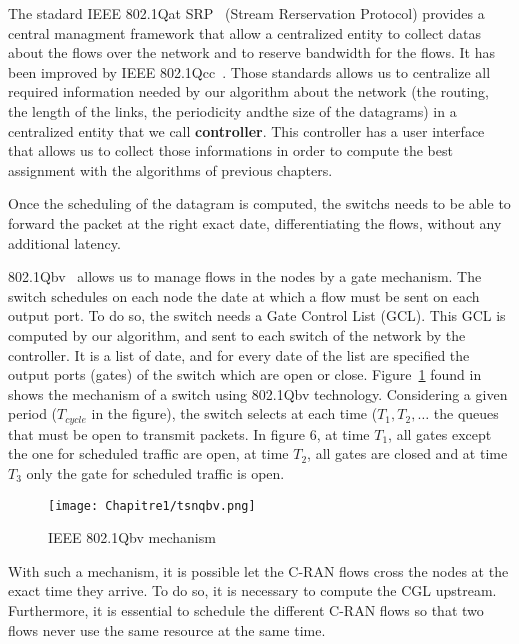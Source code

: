 The stadard IEEE 802.1Qat SRP~\cite{article} (Stream Rerservation Protocol) provides a central managment framework that allow a centralized entity to collect datas about the flows over the network and to reserve bandwidth for the flows. It has been improved by IEEE 802.1Qcc~\cite{6755436}. Those standards allows us to centralize all required information needed by our algorithm about the network (the routing, the length of the links, the periodicity andthe size of the datagrams) in a centralized entity that we call \textbf{controller}. This controller has a user interface that allows us to collect those informations in order to compute the best assignment with the algorithms of previous chapters.


Once the scheduling of the datagram is computed, the switchs needs to be able to forward the packet at the right exact date, differentiating the flows, without any additional latency. 

802.1Qbv~\cite{8613095} allows us to manage flows in the nodes by a gate mechanism. The switch schedules on each node the date at which a flow must be sent on each output port. To do so, the switch needs a Gate Control List (GCL). This GCL is computed by our algorithm, and sent to each switch of the network by the controller. It is a list of date, and for every date of the list are specified the output ports (gates) of the switch which are open or close.
Figure~\ref{fig:tsnqbv} found in~\cite{durr2016no} shows the mechanism of a switch using 802.1Qbv technology. Considering a given period ($T_{cycle}$ in the figure), the switch selects at each time ($T_1 , T_2 , \ldots$ the queues that must be open to transmit packets. In figure 6, at time $T_1$, all gates except the one for scheduled traffic are open, at time $T_2$, all gates are closed and at time $T_3$ only the gate for scheduled traffic is open.
  \begin{figure}[h]
      \begin{center}
      \texttt{[image: Chapitre1/tsnqbv.png]}
      \end{center}
      \caption{IEEE 802.1Qbv mechanism}\label{fig:tsnqbv}
      \end{figure}
      
With such a mechanism, it is possible let the C-RAN flows cross the nodes at the exact time they arrive. To do so, it is necessary to compute the CGL upstream. Furthermore, it is essential to schedule the different C-RAN flows so that two flows never use the same resource at the same time.
   
